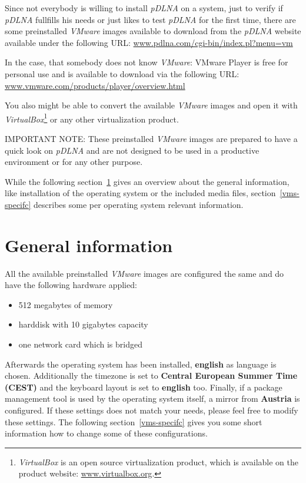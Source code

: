 \documentclass[a4paper,oneside,10pt]{report}
\newenvironment{colframeimportantnote}{%
  \begin{Sbox}
    \begin{minipage}{.99\columnwidth}
}{%
  \end{minipage}
  \end{Sbox}
  \begin{center}
    \fcolorbox{black}{Orange}{\TheSbox}
  \end{center}
}
\begin{document}
Since not everybody is willing to install {\em pDLNA} on a system, just to verify if {\em pDLNA} fullfills his needs or just likes to test {\em pDLNA} for the first time, there are some preinstalled {\em VMware} images available to download from the {\em pDLNA} website available under the following URL: \url{www.pdlna.com/cgi-bin/index.pl?menu=vm}

In the case, that somebody does not know {\em VMware}: VMware Player is free for personal use and is available to download via the following URL: \url{www.vmware.com/products/player/overview.html}

You also might be able to convert the available {\em VMware} images and open it with {\em VirtualBox}\footnote{{\em VirtualBox} is an open source virtualization product, which is available on the product website: \url{www.virtualbox.org}.} or any other virtualization product.

\begin{colframeimportantnote}
\textsc{IMPORTANT NOTE:} These preinstalled {\em VMware} images are prepared to have a quick look on {\em pDLNA} and are not designed to be used in a productive environment or for any other purpose.
\end{colframeimportantnote}

While the following section~\ref{vms-general} gives an overview about the general information, like installation of the operating system or the included media files, section~\ref{vms-specifc} describes some per operating system relevant information.

\section{General information}
\label{vms-general}

All the available preinstalled {\em VMware} images are configured the same and do have the following hardware applied:
\begin{itemize}
	\item 512 megabytes of memory
	\item harddisk with 10 gigabytes capacity
	\item one network card which is bridged
\end{itemize}

Afterwards the operating system has been installed, \textbf{english} as language is chosen. Additionally the timezone is set to \textbf{Central European Summer Time (CEST)} and the keyboard layout is set to \textbf{english} too. Finally, if a package management tool is used by the operating system itself, a mirror from \textbf{Austria} is configured. If these settings does not match your needs, please feel free to modify these settings. The following section~\ref{vms-specifc} gives you some short information how to change some of these configurations.
\end{document}

